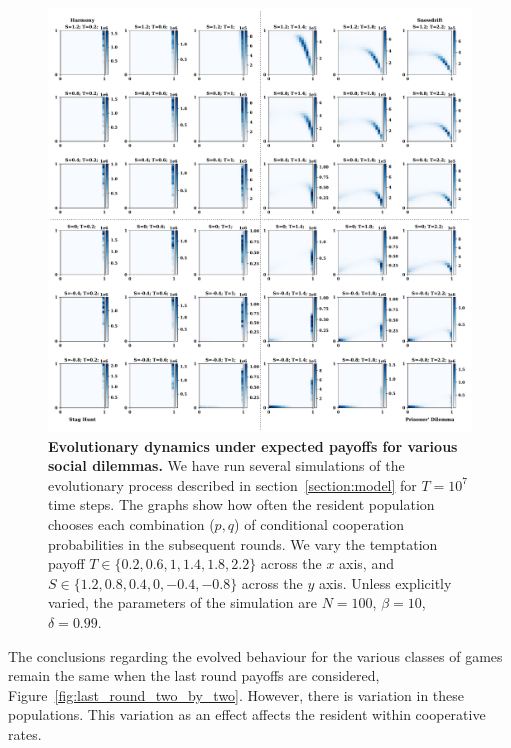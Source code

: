 \documentclass[11pt]{article}
\theoremstyle{plainCl1}
\theoremstyle{plainCl2}
\begin{document}
\begin{figure}[!htbp]
  \centering
  \includegraphics[width=\textwidth]{static/expected_two_by_two_games.pdf}
  \caption{{\bf Evolutionary dynamics under expected payoffs for various social dilemmas.} 
  We have run several simulations of the evolutionary process described in
  section~\ref{section:model} for $T\!=\!10^7$ time steps. The graphs show how
  often the resident population chooses each combination ($p,q$) of conditional
  cooperation probabilities in the subsequent rounds. We vary the temptation
  payoff \(T \in \{0.2, 0.6, 1, 1.4, 1.8, 2.2\}\)
  across the \(x\) axis, and  \(S \in \{1.2, 0.8, 0.4, 0, -0.4, -0.8\}\)
  across the \(y\) axis. Unless explicitly varied, the parameters of the simulation
  are $N\!=\!100$, $\beta\!=\!10$, $\delta\!=\!0.99$.}
  \label{fig:expected_two_by_two}
\end{figure}

The conclusions regarding the evolved behaviour for the various classes of
games remain the same when the last round payoffs are considered,
Figure~\ref{fig:last_round_two_by_two}. However, there is variation in these
populations. This variation as an effect affects the resident within cooperative
rates.
\end{document}
